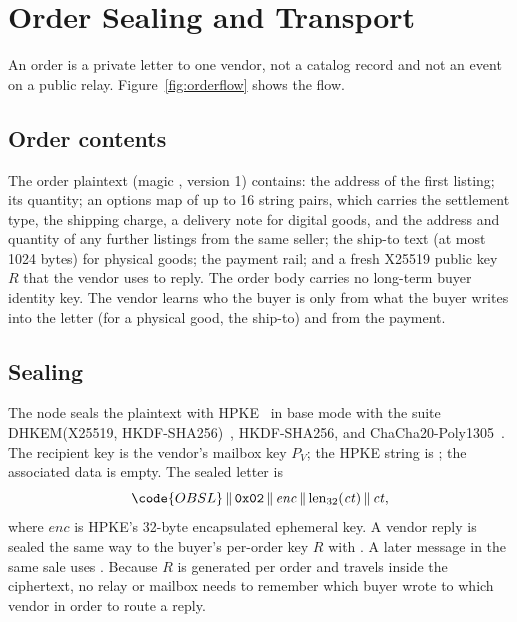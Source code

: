 \section{Order Sealing and Transport}
\label{sec:orders}



An order is a private letter to one vendor, not a catalog record and not an event on a public relay. Figure~\ref{fig:orderflow} shows the flow.

\subsection{Order contents}

The order plaintext (magic , version 1) contains: the address of the first listing; its quantity; an options map of up to 16 string pairs, which carries the settlement type, the shipping charge, a delivery note for digital goods, and the address and quantity of any further listings from the same seller; the ship-to text (at most 1024 bytes) for physical goods; the payment rail; and a fresh X25519 public key $R$ that the vendor uses to reply. The order body carries no long-term buyer identity key. The vendor learns who the buyer is only from what the buyer writes into the letter (for a physical good, the ship-to) and from the payment.

\subsection{Sealing}

The node seals the plaintext with HPKE~\citep{rfc9180} in base mode with the suite DHKEM(X25519, HKDF-SHA256)~\citep{rfc7748,rfc5869}, HKDF-SHA256, and ChaCha20-Poly1305~\citep{rfc8439}. The recipient key is the vendor's mailbox key $P_V$; the HPKE  string is ; the associated data is empty. The sealed letter is
\[
  \code{OBSL} \,\|\, \mathtt{0x02} \,\|\, \mathit{enc} \,\|\, \mathrm{len}_{32}(\mathit{ct}) \,\|\, \mathit{ct},
\]
where $\mathit{enc}$ is HPKE's 32-byte encapsulated ephemeral key. A vendor reply is sealed the same way to the buyer's per-order key $R$ with  . A later message in the same sale uses . Because $R$ is generated per order and travels inside the ciphertext, no relay or mailbox needs to remember which buyer wrote to which vendor in order to route a reply.


